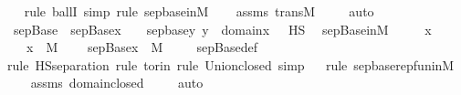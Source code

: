 \begin{isabellebody}
\ \ \isamarkupfalse%
{\isacharparenleft}{\kern0pt}rule\ ballI{\isacharcomma}{\kern0pt}\ simp{\isacharcomma}{\kern0pt}\ rule\ sep{\isacharunderscore}{\kern0pt}base{\isacharunderscore}{\kern0pt}in{\isacharunderscore}{\kern0pt}M{\isacharparenright}{\kern0pt}\isanewline
\ \ \isamarkupfalse%
\ assms\ transM\ \isanewline
\ \ \isamarkupfalse%
\ auto%
\endisatagproof
{\isafoldproof}%
%
\isadelimproof
\isanewline
%
\endisadelimproof
\isanewline
{}\isamarkupfalse%
\ sep{\isacharunderscore}{\kern0pt}Base\ \ {\isachardoublequoteopen}sep{\isacharunderscore}{\kern0pt}Base{\isacharparenleft}{\kern0pt}x{\isacharparenright}{\kern0pt}\ \ {\isasymequiv}\ {\isasymUnion}{\isacharbraceleft}{\kern0pt}\ sep{\isacharunderscore}{\kern0pt}base{\isacharparenleft}{\kern0pt}y{\isacharparenright}{\kern0pt}{\isachardot}{\kern0pt}\ y\ {\isasymin}\ domain{\isacharparenleft}{\kern0pt}x{\isacharparenright}{\kern0pt}\ {\isacharbraceright}{\kern0pt}\ {\isasyminter}\ HS{\isachardoublequoteclose}\ \isanewline
\isanewline
{}\isamarkupfalse%
\ sep{\isacharunderscore}{\kern0pt}Base{\isacharunderscore}{\kern0pt}in{\isacharunderscore}{\kern0pt}M\ {\isacharcolon}{\kern0pt}\ \isanewline
\ \ \ x\ \isanewline
\ \ \ {\isachardoublequoteopen}x\ {\isasymin}\ M{\isachardoublequoteclose}\ \isanewline
\ \ \ {\isachardoublequoteopen}sep{\isacharunderscore}{\kern0pt}Base{\isacharparenleft}{\kern0pt}x{\isacharparenright}{\kern0pt}\ {\isasymin}\ M{\isachardoublequoteclose}\ \isanewline
%
\isadelimproof
\isanewline
\ \ %
\endisadelimproof
%
\isatagproof
{}\isamarkupfalse%
\ sep{\isacharunderscore}{\kern0pt}Base{\isacharunderscore}{\kern0pt}def\ \isanewline
\ \ \isamarkupfalse%
{\isacharparenleft}{\kern0pt}rule\ HS{\isacharunderscore}{\kern0pt}separation{\isacharcomma}{\kern0pt}\ rule\ to{\isacharunderscore}{\kern0pt}rin{\isacharcomma}{\kern0pt}\ rule\ Union{\isacharunderscore}{\kern0pt}closed{\isacharcomma}{\kern0pt}\ simp{\isacharparenright}{\kern0pt}\isanewline
\ \ \isamarkupfalse%
{\isacharparenleft}{\kern0pt}rule\ sep{\isacharunderscore}{\kern0pt}base{\isacharunderscore}{\kern0pt}repfun{\isacharunderscore}{\kern0pt}in{\isacharunderscore}{\kern0pt}M{\isacharparenright}{\kern0pt}\isanewline
\ \ \isamarkupfalse%
\ assms\ domain{\isacharunderscore}{\kern0pt}closed\ \isanewline
\ \ \isamarkupfalse%
\ auto%
\endisatagproof
{\isafoldproof}%
%
\isadelimproof
\isanewline

\end{isabellebody}
